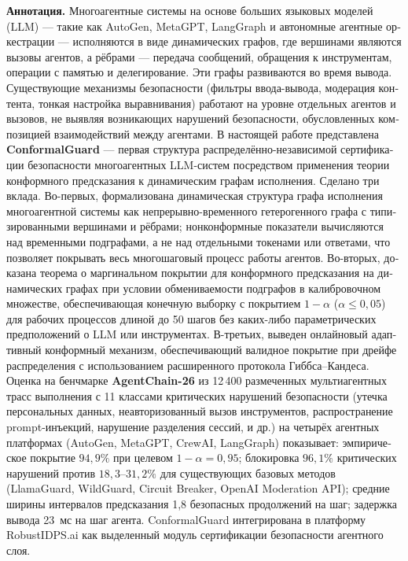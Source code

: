 \documentclass[12pt,a4paper]{article}
\theoremstyle{definition}
\theoremstyle{remark}
\begin{document}
\begin{otherlanguage}{russian}
\noindent\textbf{Аннотация.} Многоагентные системы на основе больших языковых моделей (LLM) --- такие как AutoGen, MetaGPT, LangGraph и автономные агентные оркестрации --- исполняются в виде динамических графов, где вершинами являются вызовы агентов, а рёбрами --- передача сообщений, обращения к инструментам, операции с памятью и делегирование. Эти графы развиваются во время вывода. Существующие механизмы безопасности (фильтры ввода-вывода, модерация контента, тонкая настройка выравнивания) работают на уровне отдельных агентов и вызовов, не выявляя возникающих нарушений безопасности, обусловленных композицией взаимодействий между агентами. В настоящей работе представлена \textbf{ConformalGuard} --- первая структура распределённо-независимой сертификации безопасности многоагентных LLM-систем посредством применения теории конформного предсказания к динамическим графам исполнения. Сделано три вклада. Во-первых, формализована динамическая структура графа исполнения многоагентной системы как непрерывно-временного гетерогенного графа с типизированными вершинами и рёбрами; нонконформные показатели вычисляются над временными подграфами, а не над отдельными токенами или ответами, что позволяет покрывать весь многошаговый процесс работы агентов. Во-вторых, доказана теорема о маргинальном покрытии для конформного предсказания на динамических графах при условии обмениваемости подграфов в калибровочном множестве, обеспечивающая конечную выборку с покрытием $1-\alpha$ ($\alpha \leq 0{,}05$) для рабочих процессов длиной до 50 шагов без каких-либо параметрических предположений о LLM или инструментах. В-третьих, выведен онлайновый адаптивный конформный механизм, обеспечивающий валидное покрытие при дрейфе распределения с использованием расширенного протокола Гиббса--Кандеса. Оценка на бенчмарке \textbf{AgentChain-26} из 12\,400 размеченных мультиагентных трасс выполнения с 11 классами критических нарушений безопасности (утечка персональных данных, неавторизованный вызов инструментов, распространение prompt-инъекций, нарушение разделения сессий, и др.) на четырёх агентных платформах (AutoGen, MetaGPT, CrewAI, LangGraph) показывает: эмпирическое покрытие $94{,}9\%$ при целевом $1-\alpha=0{,}95$; блокировка $96{,}1\%$ критических нарушений против $18{,}3$--$31{,}2\%$ для существующих базовых методов (LlamaGuard, WildGuard, Circuit Breaker, OpenAI Moderation API); средние ширины интервалов предсказания 1,8 безопасных продолжений на шаг; задержка вывода 23~мс на шаг агента. ConformalGuard интегрирована в платформу RobustIDPS.ai как выделенный модуль сертификации безопасности агентного слоя.


\end{otherlanguage}
\end{document}
